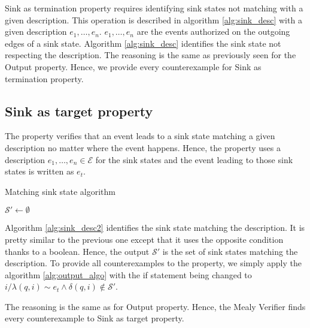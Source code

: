 Sink as termination property requires identifying sink states not matching with a given description. 
This operation is described in algorithm \ref*{alg:sink_desc} with a given description $e_1,\dots,e_n$. 
$e_1,\dots,e_n$ are the events authorized on the outgoing edges of a sink state.
Algorithm \ref*{alg:sink_desc} identifies the sink state not respecting the description.
The reasoning is the same as previously seen for the Output property. 
Hence, we provide every counterexample for Sink as termination property.


\subsection{Sink as target property}
The property verifies that an event leads to a sink state matching a given description no matter where the event happens. 
Hence, the property uses a description $e_1,\dots,e_n \in \mathcal{E}$ for the sink states and the event leading to those sink states is written as $e_t$.

\begin{algorithm}
    \caption{Matching sink state algorithm}\label{alg:sink_desc2}
    $\mathcal{S'}\gets \emptyset$\;
\end{algorithm}
Algorithm \ref*{alg:sink_desc2} identifies the sink state matching the description. 
It is pretty similar to the previous one except that it uses the opposite condition thanks to a boolean.
Hence, the output $\mathcal{S'}$ is the set of sink states matching the description.
To provide all counterexamples to the property, we simply apply the algorithm \ref*{alg:output_algo} with the if statement being changed to $i/\lambda(q,i)\sim e_t \wedge \delta(q,i)\notin \mathcal{S'}$.

The reasoning is the same as for Output property. 
Hence, the Mealy Verifier finds every counterexample to Sink as target property.


